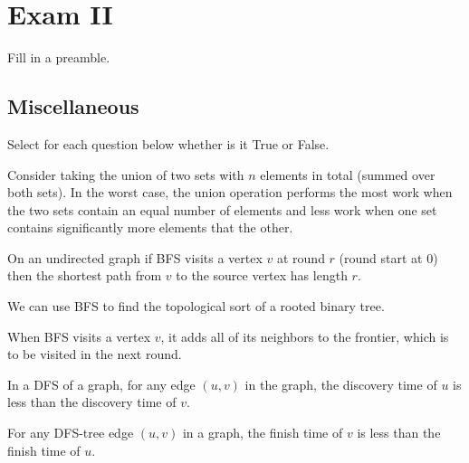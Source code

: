 \chapter{Exam II}
\label{ch:exam2}

\begin{preamble}
Fill in a preamble.
\end{preamble}

\section{Miscellaneous}

\begin{problem}

Select for each question below whether is it True or False.


\asktf 

Consider taking the union of two sets with $n$ elements in total
(summed over both sets).  In the worst case, the union operation
performs the most work when the two sets contain an equal number of
elements and less work when one set contains significantly more
elements that the other.

\solt

\asktf

On an undirected graph if  BFS visits a vertex $v$ at round $r$ (round
start at $0$) then the shortest path from $v$ to the source vertex has
length $r$.

\solt

\asktf
We can use BFS to find the topological sort of a rooted binary tree.

\solt

\asktf

When BFS visits a vertex $v$, it adds all of its neighbors to the
frontier, which is to be visited in the next round.

\solf


\asktf 

In a DFS of a graph, for any edge $(u,v)$ in the graph, the discovery
time of $u$ is less than the discovery time of $v$.  

\solf


\asktf 
For any DFS-tree edge $(u,v)$ in a graph, the finish time of $v$ is
less than the finish time of $u$.  
\solt


\end{problem}
